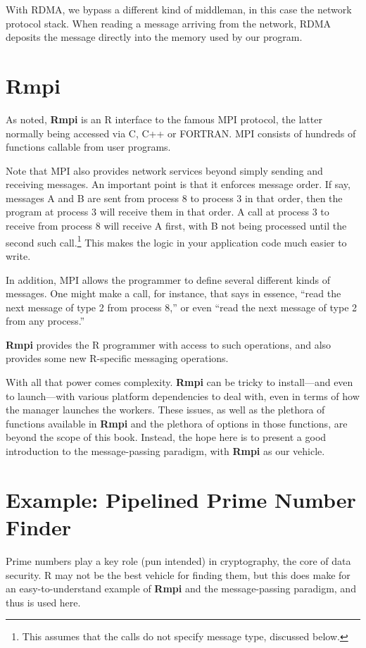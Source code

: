With RDMA, we bypass a different kind of middleman, in this case the
network protocol stack.  When reading a message arriving from the
network, RDMA deposits the message directly into the memory used by our
program.

\section{Rmpi}

As noted, {\bf Rmpi} is an R interface to the famous MPI protocol,
the latter normally being accessed via C, C++ or FORTRAN.  MPI consists
of hundreds of functions callable from user programs.

Note that MPI also provides network services beyond simply sending and
receiving messages.  An important point is that it enforces message
order.  If say, messages A and B are sent from process 8 to process 3 in
that order, then the program at process 3 will receive them in that
order.  A call at process 3 to receive from process 8 will receive A
first, with B not being processed until the second such
call.\footnote{This assumes that the calls do not specify message type,
discussed below.}  This makes the logic in your application code much
easier to write.  

In addition, MPI allows the programmer to define several different
kinds of messages.  One might make a call, for instance, that says in
essence, ``read the next message of type 2 from process 8,'' or even 
``read the next message of type 2 from any process.'' 

{\bf Rmpi} provides the R programmer with access to such operations, and
also provides some new R-specific messaging operations.

With all that power comes complexity.  {\bf Rmpi} can be tricky to
install---and even to launch---with various platform dependencies to
deal with, even in terms of how the manager launches the workers.  These
issues, as well as the plethora of functions available in {\bf Rmpi} and
the plethora of options in those functions, are beyond the scope of this
book.  Instead, the hope here is to present a good introduction to the
message-passing paradigm, with {\bf Rmpi} as our vehicle.

\section{Example:  Pipelined Prime Number Finder}

Prime numbers play a key role (pun intended) in cryptography, the core
of data security.  R may not be the best vehicle for finding them, but
this does make for an easy-to-understand example of {\bf Rmpi} and the
message-passing paradigm, and thus is used here.


